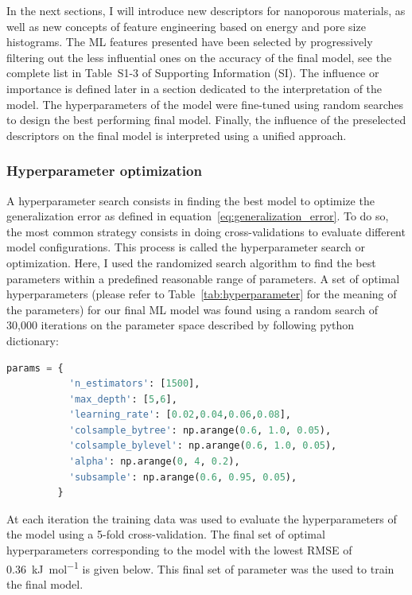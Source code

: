 \documentclass[main]{subfiles}
\begin{document}
In the next sections, I will introduce new descriptors for nanoporous materials, as well as new concepts of feature engineering based on energy and pore size histograms. The ML features presented have been selected by progressively filtering out the less influential ones on the accuracy of the final model, see the complete list in Table~S1-3 of Supporting Information (SI). The influence or importance is defined later in a section dedicated to the interpretation of the model. The hyperparameters of the model were fine-tuned using random searches to design the best performing final model. Finally, the influence of the preselected descriptors on the final model is interpreted using a unified approach.

\subsubsection{Hyperparameter optimization}\label{sct:hyperparameter}

A hyperparameter search consists in finding the best model to optimize the generalization error as defined in equation~\ref{eq:generalization_error}. To do so, the most common strategy consists in doing cross-validations to evaluate different model configurations. This process is called the hyperparameter search or optimization. Here, I used the randomized search algorithm to find the best parameters within a predefined reasonable range of parameters. A set of optimal hyperparameters (please refer to Table~\ref{tab:hyperparameter} for the meaning of the parameters) for our final ML model was found using a random search of 30,000 iterations on the parameter space described by following python dictionary:

\begin{lstlisting}[language=Python]
params = {
           'n_estimators': [1500],
           'max_depth': [5,6],
           'learning_rate': [0.02,0.04,0.06,0.08],
           'colsample_bytree': np.arange(0.6, 1.0, 0.05),
           'colsample_bylevel': np.arange(0.6, 1.0, 0.05),
           'alpha': np.arange(0, 4, 0.2),
           'subsample': np.arange(0.6, 0.95, 0.05),
         }
\end{lstlisting}

At each iteration the training data was used to evaluate the hyperparameters of the model using a 5-fold cross-validation. The final set of optimal hyperparameters corresponding to the model with the lowest RMSE of \SI{0.36}{\kilo\joule\per\mole} is given below. This final set of parameter was the used to train the final model.
\end{document}
